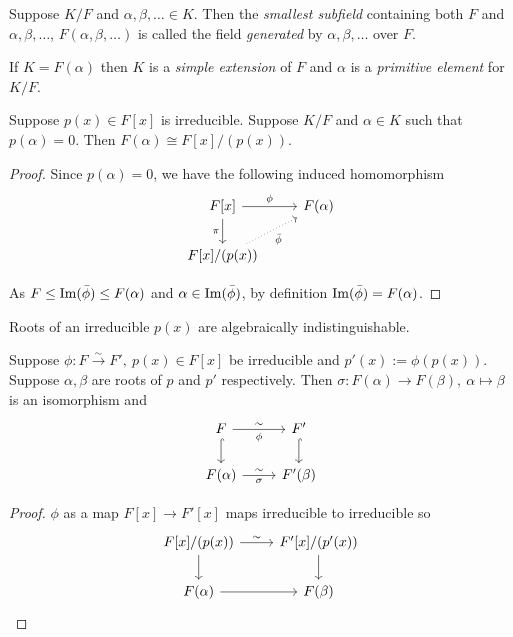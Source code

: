\documentclass[a4paper]{article}
\begin{document}
\begin{defi}
  Suppose $K/F$ and $\alpha,\beta,\ldots \in K$. Then the \emph{smallest subfield} containing both $F$ and $\alpha,\beta,\ldots$, $F(\alpha,\beta,\ldots)$ is called the field \emph{generated} by $\alpha,\beta,\ldots$ over $F$.
\end{defi}

\begin{defi}
  If $K=F(\alpha)$ then $K$ is a \emph{simple extension} of $F$ and $\alpha$ is a \emph{primitive element} for $K/F$.
\end{defi}

\begin{prop}
  Suppose $p(x) \in F[x]$ is irreducible. Suppose $K/F$ and $\alpha\in K$ such that $p(\alpha)=0$. Then $F(\alpha) \cong F[x]/(p(x))$.
\end{prop}

\begin{proof}
  Since $p(\alpha)=0$, we have the following induced homomorphism
  \[
    \begin{tikzcd}
      F[x] \arrow{r}{\phi} \arrow{d}[swap]{\pi} & F(\alpha)\\
      F[x]/(p(x)) \arrow[dotted]{ru}[swap]{\bar\phi}
    \end{tikzcd}
  \]

  As $F \leq \operatorname{Im}(\bar\phi) \leq F(\alpha)$ and $\alpha\in \operatorname{Im}(\bar\phi)$, by definition $\operatorname{Im}(\bar\phi)=F(\alpha)$.
\end{proof}

\begin{rmk}
  Roots of an irreducible $p(x)$ are algebraically indistinguishable.
\end{rmk}

\begin{thm}\label{thm:uniqueness of simple extension}
  Suppose $\phi: F\xrightarrow{\sim} F',\: p(x)\in F[x]$ be irreducible and $p'(x):=\phi(p(x))$. Suppose $\alpha,\beta$ are roots of $p$ and $p'$ respectively. Then $\sigma: F(\alpha) \rightarrow F(\beta),\:\alpha \mapsto \beta$ is an isomorphism and
  \[
    \begin{tikzcd}
      F \arrow{r}{\sim}[swap]{\phi} \arrow[hook]{d} & F' \arrow[hook]{d}\\
      F(\alpha) \arrow{r}{\sim}[swap]{\sigma} & F'(\beta)
    \end{tikzcd}
  \]
\end{thm}

\begin{proof}
  $\phi$ as a map $F[x] \rightarrow F'[x]$ maps irreducible to irreducible so
  \[
    \begin{tikzcd}
      F[x]/(p(x)) \arrow{r}{\sim} \arrow{d} & F'[x]/(p'(x)) \arrow{d}\\
      F(\alpha) \arrow{r} &F(\beta)
    \end{tikzcd}
  \]
\end{proof}
\end{document}
